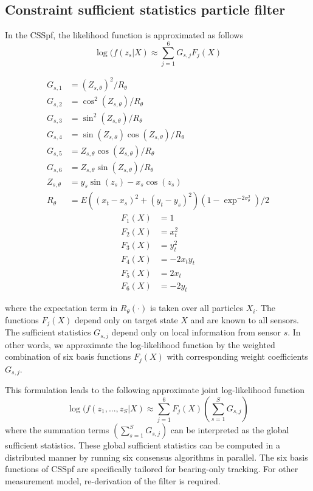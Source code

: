\documentclass[10pt,letterpaper,final]{article}
\begin{document}
\subsection{Constraint sufficient statistics particle filter}
In the CSSpf, the likelihood function is approximated as follows~\cite{Mohammadi2012}
\begin{equation}
\log(f(z_s|X) \approx \sum_{j=1}^6 G_{s,j}F_j(X)
\end{equation}
\begin{multicols}{3}
\begin{align*}
G_{s,1} &= (Z_{s,\theta})^2/R_\theta\\
G_{s,2} &= \cos^2(Z_{s,\theta})/R_\theta\\
G_{s,3} &= \sin^2(Z_{s,\theta})/R_\theta\\
G_{s,4} &= \sin(Z_{s,\theta})\cos(Z_{s,\theta})/R_\theta\\
G_{s,5} &= Z_{s,\theta}\cos(Z_{s,\theta})/R_\theta\\
G_{s,6} &= Z_{s,\theta}\sin(Z_{s,\theta})/R_\theta \\
Z_{s,\theta} &= y_s\sin(z_s)-x_s\cos(z_s) \\
R_\theta &= E((x_t-x_s)^2+(y_t-y_s)^2)(1-\exp^{-2\sigma_\theta^2})/2
\end{align*}
\vfill\null
\columnbreak
\begin{align*}
F_1(X) &= 1\\
F_2(X) &= x_t^2 \\
F_3(X) &= y_t^2\\
F_4(X) &= -2x_ty_t\\
F_5(X) &= 2x_t\\
F_6(X) &= -2y_t 
\end{align*}
\end{multicols}
where the expectation term in $R_{\theta}(\cdot)$ is taken over all particles $X_i$. The functions $F_j(X)$ depend only on target state $X$ and are known to all sensors. The sufficient statistics $G_{s,j}$ depend only on local information from sensor $s$. In other words, we approximate the log-likelihood function by the weighted combination of six basis functions $F_j(X)$ with corresponding weight coefficients $G_{s,j}$. 

This formulation leads to the following approximate joint log-likelihood function
\begin{equation}
\log(f(z_1,..., z_S|X) \approx \sum_{j=1}^6 F_j(X) \left(\sum_{s=1}^S G_{s,j}\right)
\label{eqn:llh_css}
\end{equation}
where the summation terms $\left(\sum_{s=1}^S G_{s,j}\right)$ can be interpreted as the global sufficient statistics. These global sufficient statistics can be computed in a distributed manner by running six consensus algorithms in parallel. The six basis functions of CSSpf are specifically tailored for bearing-only tracking. For other measurement model, re-derivation of the filter is required. 
\end{document}
